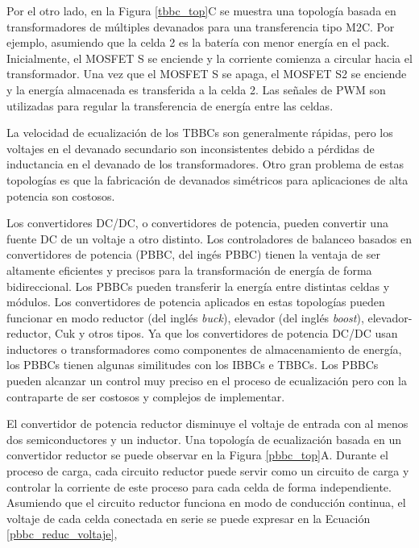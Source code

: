 \documentclass[10pt,a4paper]{article}
\newcounter{subsubsubsection}[subsubsection]
\begin{document}
Por el otro lado, en la Figura \ref{tbbc_top}C se muestra una topolog\'ia basada
en transformadores de m\'ultiples devanados para una transferencia tipo
\acrshort{M2C}. Por ejemplo, asumiendo que la celda 2 es la bater\'ia con menor 
energ\'ia en el pack. Inicialmente, el MOSFET S se enciende y la corriente 
comienza a circular hacia el transformador. Una vez que el MOSFET S se apaga, el
MOSFET S2 se enciende y la energ\'ia almacenada es transferida a la celda 2. Las
señales de \acrshort{PWM} son utilizadas para regular la transferencia de
energ\'ia entre las celdas.

La velocidad de ecualizaci\'on de los \acrshort{TBBC}s son generalmente
r\'apidas, pero los voltajes en el devanado secundario son inconsistentes debido
a p\'erdidas de inductancia en el devanado de los transformadores. Otro gran
problema de estas topolog\'ias es que la fabricaci\'on de devanados sim\'etricos
para aplicaciones de alta potencia son costosos.


Los convertidores DC/DC, o convertidores de potencia, pueden convertir una fuente
DC de un voltaje a otro distinto. Los controladores de balanceo basados en
convertidores de potencia (\acrshort{PBBC}, del ing\'es \acrlong{PBBC}) tienen
la ventaja de ser altamente eficientes y precisos para la transformaci\'on de
energ\'ia de forma bidireccional. Los \acrshort{PBBC}s pueden transferir la
energ\'ia entre distintas celdas y m\'odulos. Los convertidores de potencia
aplicados en estas topolog\'ias pueden funcionar en modo reductor (del ingl\'es
\emph{buck}), elevador (del ingl\'es \emph{boost}), elevador-reductor, Cuk y
otros tipos. Ya que los convertidores de potencia DC/DC usan inductores o
transformadores como componentes de almacenamiento de energ\'ia, los
\acrshort{PBBC}s tienen algunas similitudes con los \acrshort{IBBC}s e
\acrshort{TBBC}s. Los \acrshort{PBBC}s pueden alcanzar un control muy preciso en 
el proceso de ecualizaci\'on pero con la contraparte de ser costosos y complejos 
de implementar.

El convertidor de potencia reductor disminuye el voltaje de entrada con al menos
dos semiconductores y un inductor. Una topolog\'ia de ecualizaci\'on basada en
un convertidor reductor se puede observar en la Figura \ref{pbbc_top}A. Durante
el proceso de carga, cada circuito reductor puede servir como un circuito de
carga y controlar la corriente de este proceso para cada celda de forma 
independiente. Asumiendo que el circuito reductor funciona en modo de 
conducci\'on continua, el voltaje de cada celda conectada en serie se puede 
expresar en la Ecuaci\'on \ref{pbbc_reduc_voltaje},
\end{document}
